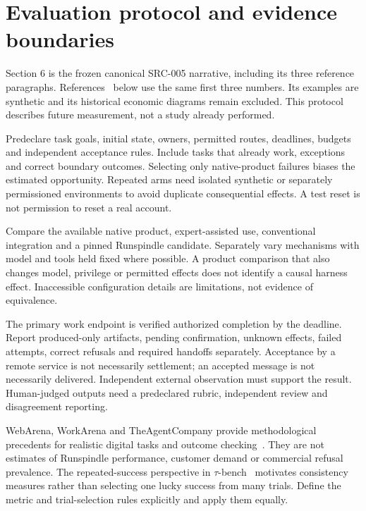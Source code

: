 \documentclass[11pt,letterpaper]{article}
\begin{document}
\section{Evaluation protocol and evidence boundaries}
\label{sec:evaluation}
Section 6 is the frozen canonical SRC-005 narrative, including its three reference
paragraphs. References~\cite{agentsmatter,anthropic2026,jcurve} below use the same
first three numbers. Its examples are synthetic and its historical economic
diagrams remain excluded. This protocol describes future measurement, not a study
already performed.

Predeclare task goals, initial state, owners, permitted routes, deadlines, budgets
and independent acceptance rules. Include tasks that already work, exceptions and
correct boundary outcomes. Selecting only native-product failures biases the
estimated opportunity. Repeated arms need isolated synthetic or separately
permissioned environments to avoid duplicate consequential effects. A test reset
is not permission to reset a real account.



Compare the available native product, expert-assisted use, conventional
integration and a pinned Runspindle candidate. Separately vary mechanisms with
model and tools held fixed where possible. A product comparison that also changes
model, privilege or permitted effects does not identify a causal harness effect.
Inaccessible configuration details are limitations, not evidence of equivalence.

The primary work endpoint is verified authorized completion by the deadline.
Report produced-only artifacts, pending confirmation, unknown effects, failed
attempts, correct refusals and required handoffs separately. Acceptance by a remote
service is not necessarily settlement; an accepted message is not necessarily
delivered. Independent external observation must support the result. Human-judged
outputs need a predeclared rubric, independent review and disagreement reporting.

WebArena, WorkArena and TheAgentCompany provide methodological precedents for
realistic digital tasks and outcome checking~\cite{webarena,workarena,agentcompany}.
They are not estimates of Runspindle performance, customer demand or commercial
refusal prevalence. The repeated-success perspective in
$\tau$-bench~\cite{taubench} motivates consistency measures rather than selecting
one lucky success from many trials. Define the metric and trial-selection rules
explicitly and apply them equally.
\end{document}
